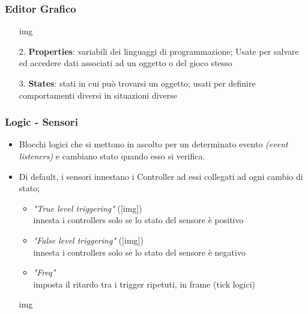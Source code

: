 \documentclass{beamer}
\begin{document}
		\begin{frame}
			\frametitle{Editor Grafico}
			\begin{itemize}
			\item [img]
				\item[2.] \textbf{Properties}: variabili dei linguaggi di programmazione; Usate per salvare ed accedere dati associati ad un oggetto o del gioco stesso
				\item[3.] \textbf{States}: stati in cui può trovarsi un oggetto; usati per definire comportamenti diversi in situazioni diverse %
			\end{itemize}
		\end{frame}
		\begin{frame}		%
			\frametitle{Logic - Sensori}
			\begin{itemize}
				\item Blocchi logici che \textcolor{BlenderOrange}{si mettono in ascolto} per un determinato evento \textit{(event listeners)} e \textcolor{BlenderOrange}{cambiano stato }quando esso si verifica.
				\item Di default, i sensori \textcolor{BlenderOrange}{innestano i Controller} ad essi collegati ad ogni cambio di stato;
				\begin{itemize}
					\item \textit{"True level triggering"} ([img]) \\ {\footnotesize\hspace{1em} innesta i controllers solo se lo stato del sensore è positivo}
					\item \textit{"False level triggering"} ([img]) \\ {\footnotesize\hspace{1em}innesta i controllers solo se lo stato del sensore è negativo}
					\item \textit{"Freq"} \\ {\footnotesize\hspace{1em}imposta il ritardo tra i trigger ripetuti, in frame (tick logici)}
				\end{itemize}
				\item [img]
			\end{itemize}
		\end{frame}		
\end{document}
